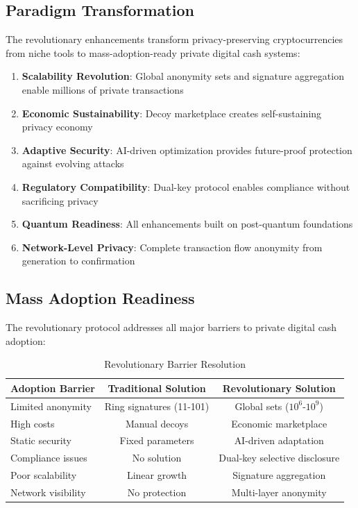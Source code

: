 \documentclass[12pt,a4paper]{article}
\begin{document}
\subsection{Paradigm Transformation}

The revolutionary enhancements transform privacy-preserving cryptocurrencies from niche tools to mass-adoption-ready private digital cash systems:

\begin{enumerate}
\item \textbf{Scalability Revolution}: Global anonymity sets and signature aggregation enable millions of private transactions
\item \textbf{Economic Sustainability}: Decoy marketplace creates self-sustaining privacy economy
\item \textbf{Adaptive Security}: AI-driven optimization provides future-proof protection against evolving attacks
\item \textbf{Regulatory Compatibility}: Dual-key protocol enables compliance without sacrificing privacy
\item \textbf{Quantum Readiness}: All enhancements built on post-quantum foundations
\item \textbf{Network-Level Privacy}: Complete transaction flow anonymity from generation to confirmation
\end{enumerate}

\subsection{Mass Adoption Readiness}

The revolutionary protocol addresses all major barriers to private digital cash adoption:

\begin{table}[h]
\centering
\begin{tabular}{lcc}
\toprule
Adoption Barrier & Traditional Solution & Revolutionary Solution \\
\midrule
Limited anonymity & Ring signatures (11-101) & Global sets ($10^6$-$10^9$) \\
High costs & Manual decoys & Economic marketplace \\
Static security & Fixed parameters & AI-driven adaptation \\
Compliance issues & No solution & Dual-key selective disclosure \\
Poor scalability & Linear growth & Signature aggregation \\
Network visibility & No protection & Multi-layer anonymity \\
\bottomrule
\end{tabular}
\caption{Revolutionary Barrier Resolution}
\end{table}
\end{document}
